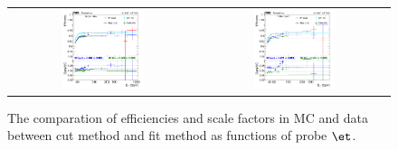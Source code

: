 \begin{figure}[bh]
  \begin{center}
    \begin{tabular}{cc}
      \includegraphics[width=0.45\textwidth]{figures/Zprime/2017/ScaleFactor/Fit_method/compare_plot/Run2017BCDEF_DYToEE_amc_barrel_Et.png} &
      \includegraphics[width=0.45\textwidth]{figures/Zprime/2017/ScaleFactor/Fit_method/compare_plot/Run2017BCDEF_DYToEE_amc_endcap_Et.png} \\
    \end{tabular}
    \caption{The comparation of efficiencies and scale factors in MC and data between cut method and fit method as functions of probe $\et$.}
    \label{fig:eff_cut_fit}
  \end{center}
\end{figure}
